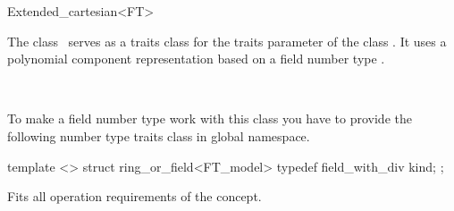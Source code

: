 
\ccAutoIndexingOff
\begin{ccRefClass}{Extended_cartesian<FT>}
\ccAutoIndexingOn
{}

\ccDefinition
  
The class \ccRefName\ serves as a traits class for the traits
parameter  of the class .  It
uses a polynomial component representation based on a field
number type . 


\ccIsModel

%
 \\

\ccCreation
{}  %



To make a field number type  work with this class you
have to provide the following number type traits class in global
namespace.

\begin{ccExampleCode}
template <>
struct ring_or_field<FT_model> {
  typedef field_with_div kind;
};    
\end{ccExampleCode}

\ccOperations

Fits all operation requirements of the concept.

\ccSeeAlso

 \\


\ccIndexTraitsClassEnd
\ccAutoIndexingOff
\end{ccRefClass}
\ccAutoIndexingOn

